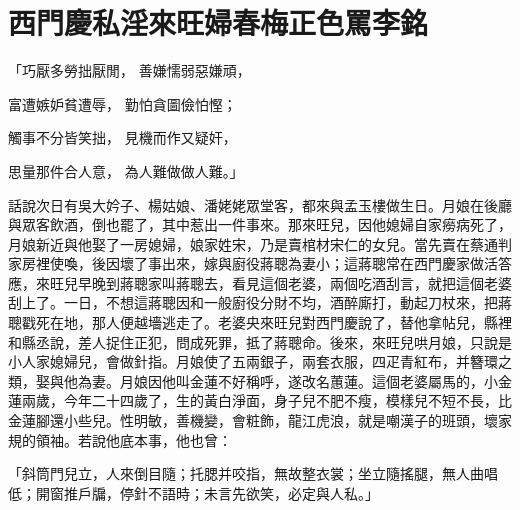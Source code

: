 %

\chapter{西門慶私淫來旺婦\KG 春梅正色罵李銘}


\begin{showcontents}{}



「巧厭多勞拙厭閒，  善嫌懦弱惡嫌頑，

富遭嫉妒貧遭辱，  勤怕貪圖儉怕慳；

觸事不分皆笑拙，  見機而作又疑奸，

思量那件合人意，  為人難做做人難。」

話說次日有吳大妗子、楊姑娘、潘姥姥眾堂客，都來與孟玉樓做生日。月娘在後廳與眾客飲酒，倒也罷了，其中惹出一件事來。那來旺兒，因他媳婦自家癆病死了，月娘新近與他娶了一房媳婦，娘家姓宋，乃是賣棺材宋仁的女兒。當先賣在蔡通判家房裡使喚，後因壞了事出來，嫁與廚役蔣聰為妻小；這蔣聰常在西門慶家做活答應，來旺兒早晚到蔣聰家叫蔣聰去，看見這個老婆，兩個吃酒刮言，就把這個老婆刮上了。一日，不想這蔣聰因和一般廚役分財不均，酒醉廝打，動起刀杖來，把蔣聰戳死在地，那人便越墻逃走了。老婆央來旺兒對西門慶說了，替他拿帖兒，縣裡和縣丞說，差人捉住正犯，問成死罪，抵了蔣聰命。後來，來旺兒哄月娘，只說是小人家媳婦兒，會做針指。月娘使了五兩銀子，兩套衣服，四疋青紅布，并簪環之類，娶與他為妻。月娘因他叫金蓮不好稱呼，遂改名蕙蓮。這個老婆屬馬的，小金蓮兩歲，今年二十四歲了，生的黃白淨面，身子兒不肥不瘦，模樣兒不短不長，比金蓮腳還小些兒。性明敏，善機變，會粧飾，龍江虎浪，就是嘲漢子的班頭，壞家規的領袖。若說他底本事，他也曾：

「斜筒門兒立，人來倒目隨；托腮并咬指，無故整衣裳；坐立隨搖腿，無人曲唱低；開窗推戶牖，停針不語時；未言先欲笑，必定與人私。」


\end{showcontents}
